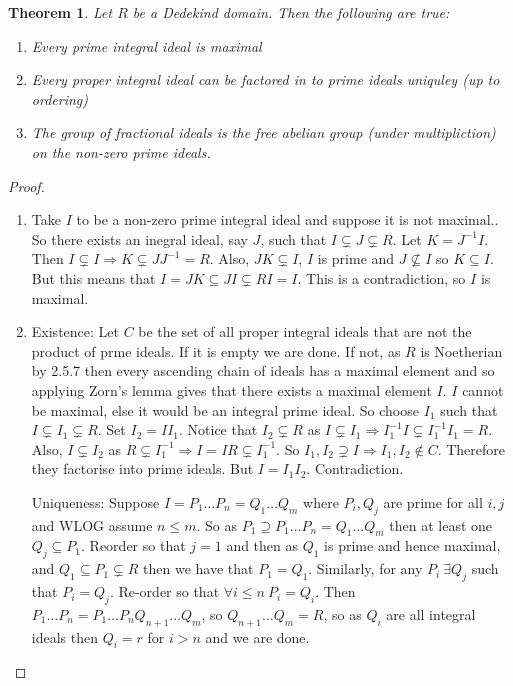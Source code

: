 \documentclass[a4paper,10pt]{article}
\newtheorem{thm}{Theorem}[subsection]
\begin{document}
\begin{thm}
Let $R$ be a Dedekind domain. Then the following are true:
\begin{enumerate}
		\item Every prime integral ideal is maximal
		\item Every proper integral ideal can be factored in to prime ideals uniquley (up to ordering)
		\item The group of fractional ideals is the free  abelian group (under multipliction) on the non-zero prime ideals.
	\end{enumerate}
\end{thm}
\begin{proof}
\begin{enumerate}
 \item Take $I$ to be a non-zero prime integral ideal and suppose it is not maximal.. So there exists an inegral ideal, say $J$, such that $I\subsetneq J\subsetneq R$. Let $K=J^{-1}I$. Then $I\subsetneq I\Rightarrow K\subsetneq JJ^{-1}=R$. Also, $JK\subsetneq I$, $I$ is prime and $J\nsubseteq I$ so $K\subseteq I$. But this means that $I=JK\subseteq JI\subsetneq RI=I$. This is a contradiction, so $I$ is maximal.

\item Existence: Let $C$ be the set of all proper integral ideals  that are not the product of prme ideals. If it is empty we are done. If not, as $R$ is Noetherian by 2.5.7 then every ascending chain of ideals has a maximal element and so applying Zorn's lemma gives that there exists a maximal element $I$. $I$ cannot be maximal, else it would be an integral prime ideal. So choose $I_{1}$ such that $I\subsetneq I_{1}\subsetneq R$. Set $I_{2}=II_{1}$. Notice that $I_{2}\subsetneq R$ as $I\subsetneq I_{1}\Rightarrow I_{1}^{-1}I\subsetneq I_{1}^{-1}I_{1}=R$. Also, $I\subsetneq I_{2}$ as $R\subsetneq I_{1}^{-1}\Rightarrow I=IR\subsetneq I_{1}^{-1}$. So $I_{1},I_{2}\supsetneq I\Rightarrow I_{1},I_{2}\notin C$. Therefore they factorise into prime ideals. But $I=I_{1}I_{2}$. Contradiction.

 Uniqueness:  Suppose $I=P_{1}\ldots P_{n}=Q_{1}\ldots Q_{m}$ where $P_{i},Q_{j}$ are prime for all $i,j$ and WLOG assume $n\leq m$. So as $P_{1}\supseteq P_{1}\ldots P_{n}=Q_{1}\ldots Q_{m}$ then at least one $Q_{j}\subseteq P_{1}$. Reorder so that $j=1$ and then as $Q_{1}$ is prime and hence maximal, and $Q_{1}\subseteq P_{1}\subsetneq R$ then we have that $P_{1}=Q_{1}$. Similarly, for any $P_{i}\ \exists Q_{j}$ such that $P_{i}=Q_{j}$. Re-order so that $\forall i\leq n\  P_{i}=Q_{i}$. Then $P_{1}\ldots P_{n}=P_{1}\ldots P_{n}Q_{n+1}\ldots Q_{m}$, so $Q_{n+1}\ldots Q_{m}=R$, so as $Q_{i}$ are all integral ideals then $Q_{i}=r$ for $i>n$ and we are done.


\end{enumerate}
\end{proof}
\end{document}
